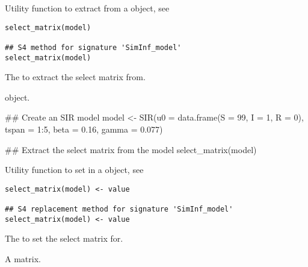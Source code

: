 \documentclass[letterpaper]{book}
\begin{document}
%
\begin{Description}
Utility function to extract  from a
 object, see 
\end{Description}
%
\begin{Usage}
\begin{verbatim}
select_matrix(model)

## S4 method for signature 'SimInf_model'
select_matrix(model)
\end{verbatim}
\end{Usage}
%
\begin{Arguments}
\begin{ldescription}
\item[\code{model}] The  to extract the select matrix
 from.
\end{ldescription}
\end{Arguments}
%
\begin{Value}
 object.
\end{Value}
%
\begin{Examples}
\begin{ExampleCode}
## Create an SIR model
model <- SIR(u0 = data.frame(S = 99, I = 1, R = 0),
             tspan = 1:5, beta = 0.16, gamma = 0.077)

## Extract the select matrix from the model
select_matrix(model)
\end{ExampleCode}
\end{Examples}
%
\begin{Description}
Utility function to set  in a 
object, see 
\end{Description}
%
\begin{Usage}
\begin{verbatim}
select_matrix(model) <- value

## S4 replacement method for signature 'SimInf_model'
select_matrix(model) <- value
\end{verbatim}
\end{Usage}
%
\begin{Arguments}
\begin{ldescription}
\item[\code{model}] The  to set the select matrix for.

\item[\code{value}] A matrix.
\end{ldescription}
\end{Arguments}
\end{document}
